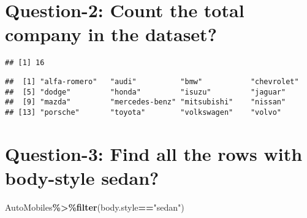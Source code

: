 \documentclass[
]{article}
\newenvironment{Shaded}{\begin{snugshade}}{\end{snugshade}}
\newcommand{\FunctionTok}[1]{\textcolor[rgb]{0.13,0.29,0.53}{\textbf{#1}}}
\newcommand{\NormalTok}[1]{#1}
\newcommand{\SpecialCharTok}[1]{\textcolor[rgb]{0.81,0.36,0.00}{\textbf{#1}}}
\newcommand{\StringTok}[1]{\textcolor[rgb]{0.31,0.60,0.02}{#1}}
\begin{document}
\hypertarget{question-2-count-the-total-company-in-the-dataset}{%
\section{Question-2: Count the total company in the
dataset?}\label{question-2-count-the-total-company-in-the-dataset}}

\begin{Shaded}
\end{Shaded}

\begin{verbatim}
## [1] 16
\end{verbatim}

\begin{Shaded}
\end{Shaded}

\begin{verbatim}
##  [1] "alfa-romero"   "audi"          "bmw"           "chevrolet"    
##  [5] "dodge"         "honda"         "isuzu"         "jaguar"       
##  [9] "mazda"         "mercedes-benz" "mitsubishi"    "nissan"       
## [13] "porsche"       "toyota"        "volkswagen"    "volvo"
\end{verbatim}

\hypertarget{question-3-find-all-the-rows-with-body-style-sedan}{%
\section{Question-3: Find all the rows with body-style
sedan?}\label{question-3-find-all-the-rows-with-body-style-sedan}}

\begin{Shaded}
\begin{Highlighting}[]
\NormalTok{AutoMobiles}\SpecialCharTok{\%\textgreater{}\%}\FunctionTok{filter}\NormalTok{(body.style}\SpecialCharTok{==}\StringTok{"sedan"}\NormalTok{)}
\end{Highlighting}
\end{Shaded}
\end{document}
